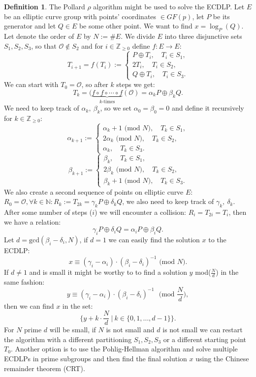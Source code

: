 \documentclass[thesis=M,english]{FITthesis}[2012/10/20]
\theoremstyle{remark}
\theoremstyle{definition}
\newtheorem{DF}{Definition}[section]
\begin{document}
 \begin{DF}
 The Pollard $\rho$ algorithm might be used to solve the ECDLP. Let $E$ be an elliptic curve group with points' coordinates $\in GF(p)$, let $P$ be its generator and let $Q \in E$ be some other point. We want to find $x=\log_P(Q)$. Let denote the order of $E$ by $N := \#E$. We divide $E$ into three disjunctive sets $S_1, S_2, S_3$, so that $\mathcal{O} \not\in S_2$ and for $i \in \mathbb{Z}_{\geq 0}$ define $f: E \to E$:
 $$
 T_{i+1} = f(T_i) := \begin{cases} P \oplus T_i,\quad T_i \in S_1, \\
 2T_i, \quad T_i \in S_2, \\
 Q \oplus T_i, \quad T_i \in S_3.
 \end{cases}
 $$
 We can start with $T_0 = \mathcal{O}$, so after $k$ steps we get:
 $$
 T_k = (\underbrace{f\circ f \circ \cdots \circ f}_\text{$k$-times}(\mathcal{O}) = \alpha_k P \oplus \beta_k Q.
 $$
 We need to keep track of $\alpha_k,\ \beta_k$, so we set $\alpha_0 = \beta_0 = 0$ and define it recursively for $k \in \mathbb{Z}_{\geq 0}$:
$$ 
  \alpha_{k+1} := \begin{cases} \alpha_k + 1\text{ (mod $N$)},\quad T_k \in S_1, \\
 2\alpha_k\text{ (mod $N$)}, \quad T_k \in S_2, \\
 \alpha_k, \quad T_k \in S_3.
 \end{cases}
$$
$$ 
  \beta_{k+1} := \begin{cases} \beta_k,\quad T_k \in S_1, \\
 2\beta_k\text{ (mod $N$)}, \quad T_k \in S_2, \\
 \beta_k + 1\text{ (mod $N$)}, \quad T_k \in S_3.
 \end{cases}
$$
We also create a second sequence of points on elliptic curve $E$: $R_0 = \mathcal{O},\forall k \in \mathbb{N}: R_k := T_{2k} = \gamma_kP \oplus \delta_kQ$, we also need to keep track of $\gamma_k,\ \delta_k$. After some number of steps ($i$) we will encounter a collision: $R_i = T_{2i} = T_i$, then we have a relation: 
$$
\gamma_iP \oplus \delta_iQ = \alpha_iP \oplus \beta_iQ.
$$
Let $d = \text{gcd}(\beta_i - \delta_i, N)$, if $d=1$ we can easily find the solution $x$ to the ECDLP:
$$
x \equiv (\gamma_i - \alpha_i)\cdot(\beta_i - \delta_i)^{-1} \text{ (mod $N$)}.
$$
If $d \neq 1$ and is small it might be worthy to to find a solution $y$ mod($\frac{N}{d}$) in the same fashion:
$$
y \equiv (\gamma_i - \alpha_i)\cdot(\beta_i - \delta_i)^{-1} \text{ $\bigg($mod $\frac{N}{d}\bigg)$}, 
$$then we can find $x$ in the set:
$$
\bigg\{y + k\cdot\frac{N}{d}\ \bigg| \ k \in \{0, 1, \ldots, d -1\}\bigg\}.
$$
For $N$ prime $d$ will be small, if $N$ is not small and $d$ is not small we can restart the algorithm with a different partitioning $S_1,S_2,S_3$ or a different starting point $T_0$. Another option is to use the Pohlig-Hellman algorithm and solve multiple ECDLPs in prime subgroups and then find the final solution $x$ using the Chinese remainder theorem (CRT).
\end{DF}
\end{document}
